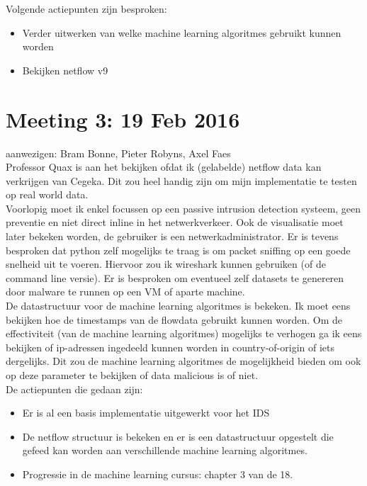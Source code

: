 \noindent Volgende actiepunten zijn besproken:
\begin{itemize}  
		\item Verder uitwerken van welke machine learning algoritmes gebruikt kunnen worden
        \item Bekijken netflow v9
\end{itemize}
\section{Meeting 3: 19 Feb 2016}
aanwezigen: Bram Bonne, Pieter Robyns, Axel Faes\\

\noindent Professor Quax is aan het bekijken ofdat ik (gelabelde) netflow data kan verkrijgen van Cegeka. Dit zou heel handig zijn om mijn implementatie te testen op real world data.\\

\noindent Voorlopig moet ik enkel focussen op een passive intrusion detection systeem, geen preventie en niet direct inline in het netwerkverkeer. Ook de visualisatie moet later bekeken worden, de gebruiker is een netwerkadministrator. Er is tevens besproken dat python zelf mogelijks te traag is om packet sniffing op een goede snelheid uit te voeren. Hiervoor zou ik wireshark kunnen gebruiken (of de command line versie). Er is besproken om eventueel zelf datasets te genereren door malware te runnen op een VM of aparte machine.\\

\noindent De datastructuur voor de machine learning algoritmes is bekeken. Ik moet eens bekijken hoe de timestamps van de flowdata gebruikt kunnen worden. Om de effectiviteit (van de machine learning algoritmes) mogelijks te verhogen ga ik eens bekijken of ip-adressen ingedeeld kunnen worden in country-of-origin of iets dergelijks. Dit zou de machine learning algoritmes de mogelijkheid bieden om ook op deze parameter te bekijken of data malicious is of niet.\\

\noindent De actiepunten die gedaan zijn:
\begin{itemize}  
		\item Er is al een basis implementatie uitgewerkt voor het IDS
        \item De netflow structuur is bekeken en er is een datastructuur opgestelt die gefeed kan worden aan verschillende machine learning algoritmes.
        \item Progressie in de machine learning cursus: chapter 3 van de 18.
\end{itemize}

